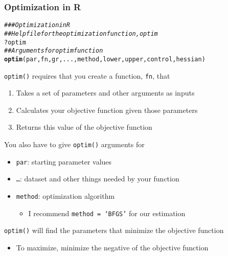 \documentclass{beamer}\usepackage[]{graphicx}\usepackage[]{xcolor}
\makeatletter
\newcommand{\hlcom}[1]{\textcolor[rgb]{0.678,0.584,0.686}{\textit{#1}}}%
\newcommand{\hlopt}[1]{\textcolor[rgb]{0,0,0}{#1}}%
\newcommand{\hlstd}[1]{\textcolor[rgb]{0.345,0.345,0.345}{#1}}%
\newcommand{\hlkwd}[1]{\textcolor[rgb]{0.737,0.353,0.396}{\textbf{#1}}}%
\newenvironment{kframe}{%
 \def\at@end@of@kframe{}%
 \ifinner\ifhmode%
  \def\at@end@of@kframe{\end{minipage}}%
  \begin{minipage}{\columnwidth}%
 \fi\fi%
 \def\FrameCommand##1{\hskip\@totalleftmargin \hskip-\fboxsep
 \colorbox{shadecolor}{##1}\hskip-\fboxsep
     \hskip-\linewidth \hskip-\@totalleftmargin \hskip\columnwidth}%
 \MakeFramed {\advance\hsize-\width
   \@totalleftmargin\z@ \linewidth\hsize
   \@setminipage}}%
 {\par\unskip\endMakeFramed%
 \at@end@of@kframe}
\newenvironment{knitrout}{}{} %
\makeatother
\begin{document}
\begin{frame}[fragile]\frametitle{Optimization in R}
\begin{knitrout}\footnotesize
{}\color{fgcolor}\begin{kframe}
\begin{alltt}
\hlcom{### Optimization in R}
\hlcom{## Help file for the optimization function, optim}
\hlopt{?}\hlstd{optim}
\hlcom{## Arguments for optim function}
\hlkwd{optim}\hlstd{(par, fn, gr, ..., method, lower, upper, control, hessian)}
\end{alltt}
\end{kframe}
\end{knitrout}
    \vspace{1ex}
    \texttt{optim()} requires that you create a function, \texttt{fn}, that
    \begin{enumerate}
        \item Takes a set of parameters and other arguments as inputs
        \item Calculates your objective function given those parameters
        \item Returns this value of the objective function
    \end{enumerate}
    \vspace{1ex}
    You also have to give \texttt{optim()} arguments for
    \begin{itemize}
        \item \texttt{par}: starting parameter values
        \item \texttt{\ldots}: dataset and other things needed by your function
        \item \texttt{method}: optimization algorithm
        \begin{itemize}
            \item I recommend \texttt{method = `BFGS'} for our estimation
        \end{itemize}
    \end{itemize}
    \vspace{1ex}
    \texttt{optim()} will find the parameters that minimize the objective function
    \begin{itemize}
        \item To maximize, minimize the negative of the objective function
    \end{itemize}
\end{frame}
\end{document}
